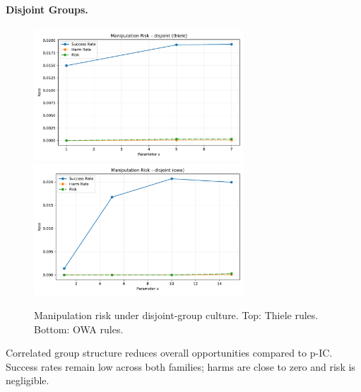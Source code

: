 \documentclass[11pt]{article}
\begin{document}
\paragraph{Disjoint Groups.}
\begin{figure}[h!]
\centering
\includegraphics[width=0.7\textwidth]{figures/risk_disjoint_thiele.pdf}
\includegraphics[width=0.7\textwidth]{figures/risk_disjoint_owa.pdf}
\caption{Manipulation risk under disjoint-group culture. Top: Thiele rules. Bottom: OWA rules.}
\end{figure}
Correlated group structure reduces overall opportunities compared to p-IC. Success
rates remain low across both families; harms are close to zero and risk is negligible.
\end{document}
